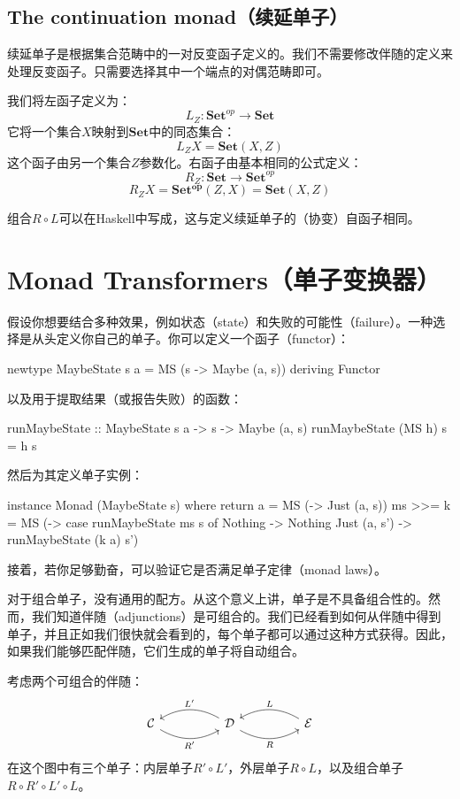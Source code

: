 \documentclass[DaoFP]{subfiles}
\begin{document}
    \subsection{The continuation monad（续延单子）}

    续延单子是根据集合范畴中的一对反变函子定义的。我们不需要修改伴随的定义来处理反变函子。只需要选择其中一个端点的对偶范畴即可。

    我们将左函子定义为：
    \[ L_Z \colon \mathbf{Set}^{op} \to \mathbf{Set} \]
    它将一个集合$X$映射到$\mathbf{Set}$中的同态集合：
    \[ L_Z X = \mathbf{Set}(X, Z) \]
    这个函子由另一个集合$Z$参数化。右函子由基本相同的公式定义：
    \[ R_Z \colon \mathbf{Set} \to \mathbf{Set}^{op} \]
    \[ R_Z X = \mathbf{Set^{op}}(Z, X)  = \mathbf{Set}(X, Z) \]

    组合$R \circ L$可以在Haskell中写成，这与定义续延单子的（协变）自函子相同。

    \section{Monad Transformers（单子变换器）}

    假设你想要结合多种效果，例如状态（state）和失败的可能性（failure）。一种选择是从头定义你自己的单子。你可以定义一个函子（functor）：
    \begin{haskell}
        newtype MaybeState s a = MS (s -> Maybe (a, s))
        deriving Functor
    \end{haskell}
    以及用于提取结果（或报告失败）的函数：
    \begin{haskell}
        runMaybeState :: MaybeState s a -> s -> Maybe (a, s)
        runMaybeState (MS h) s = h s
    \end{haskell}
    然后为其定义单子实例：
    \begin{haskell}
        instance Monad (MaybeState s) where
        return a = MS (\s -> Just (a, s))
        ms >>= k = MS (\s -> case runMaybeState ms s of
        Nothing -> Nothing
        Just (a, s') -> runMaybeState (k a) s')
    \end{haskell}
    接着，若你足够勤奋，可以验证它是否满足单子定律（monad laws）。

    对于组合单子，没有通用的配方。从这个意义上讲，单子是不具备组合性的。然而，我们知道伴随（adjunctions）是可组合的。我们已经看到如何从伴随中得到单子，并且正如我们很快就会看到的，每个单子都可以通过这种方式获得。因此，如果我们能够匹配伴随，它们生成的单子将自动组合。

    考虑两个可组合的伴随：
    \[
        \begin{tikzcd}
            \mathcal{C}
            \arrow[rr, bend right, "R'"']
            &&
            \mathcal{D}
            \arrow[ll, bend right, "L'"']
            \arrow[rr, bend right, "R"']
            &&
            \mathcal{E}
            \arrow[ll, bend right, "L"']
        \end{tikzcd}
    \]
    在这个图中有三个单子：内层单子$R' \circ L'$，外层单子$R \circ L$，以及组合单子$R \circ R' \circ L' \circ L$。
\end{document}
